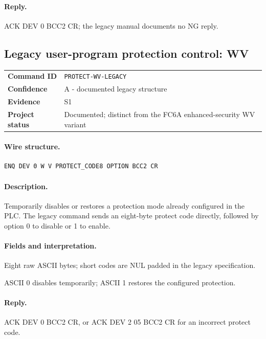 \documentclass[10pt,letterpaper]{article}
\begin{document}
\paragraph{Reply.} ACK DEV 0 BCC2 CR; the legacy manual documents no NG reply.

\subsection{Legacy user-program protection control: WV}
\begin{tabularx}{\textwidth}{@{}>{\bfseries}p{2.8cm}X@{}}
Command ID & \texttt{PROTECT-WV-LEGACY} \\
Confidence & A - documented legacy structure \\
Evidence & S1 \\
Project status & Documented; distinct from the FC6A enhanced-security WV variant \\
\end{tabularx}
\vspace{0.35em}
\paragraph{Wire structure.}
\begin{Verbatim}[breaklines=true,breakanywhere=true,fontsize=\small]
ENQ DEV 0 W V PROTECT_CODE8 OPTION BCC2 CR
\end{Verbatim}
\paragraph{Description.} Temporarily disables or restores a protection mode already configured in the PLC. The legacy command sends an eight-byte protect code directly, followed by option 0 to disable or 1 to enable.
\paragraph{Fields and interpretation.}
\begin{description}[style=nextline,leftmargin=3.2cm,labelwidth=3.0cm,font=\normalfont\bfseries]
\item[PROTECT\_CODE8] Eight raw ASCII bytes; short codes are NUL padded in the legacy specification.
\item[OPTION] ASCII 0 disables temporarily; ASCII 1 restores the configured protection.
\end{description}
\paragraph{Reply.} ACK DEV 0 BCC2 CR, or ACK DEV 2 05 BCC2 CR for an incorrect protect code.
\end{document}
